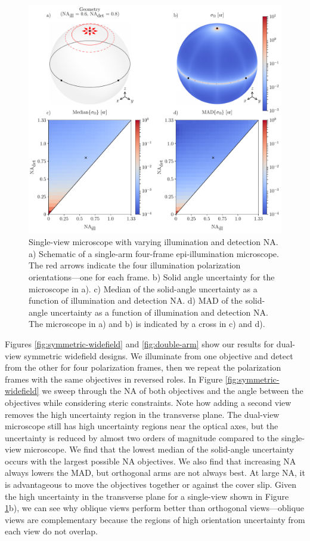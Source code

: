 \documentclass[10pt]{article}
\begin{document}
\begin{figure}[htbp]
\centering\includegraphics[width=\textwidth]{single-arm}
\caption{Single-view microscope with varying illumination and detection
  NA. a) Schematic of a single-arm four-frame epi-illumination microscope. The
  red arrows indicate the four illumination polarization orientations---one for
  each frame. b) Solid angle uncertainty for the microscope in a). c) Median of
  the solid-angle uncertainty as a function of illumination and detection NA. d)
  MAD of the solid-angle uncertainty as a function of illumination and detection
  NA. The microscope in a) and b) is indicated by a cross in c) and d).}
\label{fig:single-arm}
\end{figure}

Figures \ref{fig:symmetric-widefield} and \ref{fig:double-arm} show our results
for dual-view symmetric widefield designs. We illuminate from one objective and
detect from the other for four polarization frames, then we repeat the
polarization frames with the same objectives in reversed roles. In Figure
\ref{fig:symmetric-widefield} we sweep through the NA of both objectives and the
angle between the objectives while considering steric constraints. Note how
adding a second view removes the high uncertainty region in the transverse
plane. The dual-view microscope still has high uncertainty regions near the
optical axes, but the uncertainty is reduced by almost two orders of magnitude
compared to the single-view microscope. We find that the lowest median of the
solid-angle uncertainty occurs with the largest possible NA objectives. We also
find that increasing NA always lowers the MAD, but orthogonal arms are not
always best. At large NA, it is advantageous to move the objectives together or
against the cover slip. Given the high uncertainty in the transverse plane for a
single-view shown in Figure \ref{fig:single-arm}b), we can see why oblique views
perform better than orthogonal views---oblique views are complementary because
the regions of high orientation uncertainty from each view do not overlap.
\end{document}
